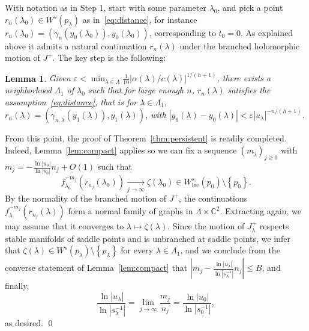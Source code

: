 \documentclass[11pt, oneside]{amsart}
\newcommand{\C}{\mathbb{C}}
\newcommand{\e}{\varepsilon}
\newcommand{\set}[1]{\left\{#1\right\}}
\newcommand{\abs}[1]{\left\vert#1\right\vert}
\newcommand{\la}{\lambda}
\newcommand{\lo}{{\lambda_0}}
\newcommand{\loc}{{\mathrm{loc}}}
\newcommand{\jstar}{J^\varstar}
\newcommand{\inv}{^{-1}}
\newtheorem{lem}[prop] {Lemma}
\theoremstyle{remark}
\theoremstyle{definition}
\theoremstyle{theorem}
\begin{document}
With notation as in Step 1, 
start with some parameter $\lo$, and pick a 
point $r_n(\lo)\in W^s(p_\lambda)$ as in~\eqref{eq:distance}, 
for instance  
$r_n(\lo) = (\gamma_n(y_0(\lo)), y_0(\lo))$, corresponding to $t_0=0$. As explained above 
it admits a natural continuation $r_n(\la)$ under the branched holomorphic 
motion of $J^+$. 
The key step is the following:

\begin{lem}\label{lem:polygon} Given 
$\e< \min_{\la\in \Lambda} \frac{1}{10}\abs{\alpha(\lambda)/c(\lambda)}^{1/(h+1)}$, 
there exists a neighborhood $\Lambda_1$ of $\lo$ such that for large enough $n$, 
$r_n(\lambda)$ satisfies the assumption~\eqref{eq:distance}, that is for $\lambda\in \Lambda_1$, 
$r_n(\lambda) = (\gamma_{n, \lambda}( y_1(\la)), y_1(\la))$, with 
$\abs{y_1(\la) - y_0(\lambda)} <\e \abs{u_\lambda}^{-n/(h+1)}$. 
\end{lem}

From this point, the proof of Theorem~\ref{thm:persistent} is readily completed. Indeed, 
Lemma~\ref{lem:compact} applies so we can fix a sequence 
$(m_{j})_{j\geq 0}$   with $m_{j} = -\frac{\ln{\abs{u_0}}}{\ln\abs{s_0}} n_j + O(1)$ such that
$$f_\lo^{-m_{j}}(r_{n_j}(\lo)) \underset{j\to\infty}\longrightarrow
\zeta(\lo)\in W^s_\loc(p_0)\setminus \set{p_0}.$$ By the normality 
of the branched motion of $J^+$, 
the continuations $f_\la^{-m_{j}}(r_{n_j}(\la))$ form a normal family of graphs in $\Lambda\times \C^2$. Extracting again, we may assume that it converges to $\la\mapsto \zeta(\la)$. Since the motion of $J^+_\la$ respects stable manifolds of saddle points and is unbranched at saddle points, we infer that $\zeta(\lambda)\in W^s(p_\lambda)\setminus \set{p_\lambda}$ for every $\lambda\in \Lambda_1$, 
and we conclude 
from the converse statement of Lemma~\ref{lem:compact} that 
$\abs{m_j  - \frac{\ln{\abs{u_\lambda}}}{\ln\abs{s_\lambda\inv }} n_j}\leq B$, and finally, 
$$\frac{\ln{\abs{u_\lambda}}}{\ln\abs{s_\lambda\inv}} = \lim_{j\to\infty} \frac{m_j}{n_j} = \frac{\ln{\abs{u_0}}}{\ln\abs{s_0\inv}},$$
as desired. \qed
 
\end{document}
